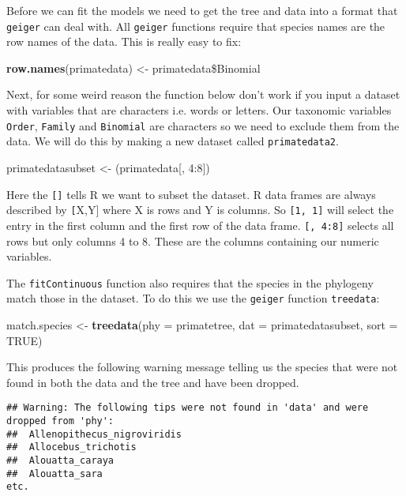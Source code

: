 \documentclass[11pt]{article}
\newcommand{\KeywordTok}[1]{\textcolor[rgb]{0.13,0.29,0.53}{\textbf{{#1}}}}
\newcommand{\DataTypeTok}[1]{\textcolor[rgb]{0.13,0.29,0.53}{{#1}}}
\newcommand{\DecValTok}[1]{\textcolor[rgb]{0.00,0.00,0.81}{{#1}}}
\newcommand{\StringTok}[1]{\textcolor[rgb]{0.31,0.60,0.02}{{#1}}}
\newcommand{\OtherTok}[1]{\textcolor[rgb]{0.56,0.35,0.01}{{#1}}}
\newcommand{\NormalTok}[1]{{#1}}
\begin{document}
Before we can fit the models we need to get the tree and data into a format that \texttt{geiger} can deal with. All \texttt{geiger} functions require that species names are the row names of the data. This is really easy to fix:

\begin{snugshade}
\begin{Highlighting}[]
\KeywordTok{row.names}\NormalTok{(primatedata) <-}\StringTok{ }\NormalTok{primatedata\$Binomial}
\end{Highlighting}
\end{snugshade}

Next, for some weird reason the function below don't work if you input a dataset with variables that are characters i.e. words or letters. Our taxonomic variables \texttt{Order}, \texttt{Family} and \texttt{Binomial} are characters so we need to exclude them from the data. We will do this by making a new dataset called \texttt{primatedata2}.

\begin{snugshade}
\begin{Highlighting}[]
\NormalTok{primatedatasubset <-}\StringTok{ }\NormalTok{(primatedata[,} \DecValTok{4:8}\NormalTok{])}
\end{Highlighting}
\end{snugshade}

Here the \texttt{[]} tells R we want to subset the dataset. R data frames are always described by \texttt[X,Y] where X is rows and Y is columns. So \texttt{[1, 1]} will select the entry in the first column and the first row of the data frame. \texttt{[, 4:8]} selects all rows but only columns 4 to 8. These are the columns containing our numeric variables.

The \texttt{fitContinuous} function also requires that the species in the phylogeny match those in the dataset. To do this we use the \texttt{geiger} function \texttt{treedata}:

\begin{snugshade}
\begin{Highlighting}[]
\NormalTok{match.species <-}\StringTok{ }\KeywordTok{treedata}\NormalTok{(}\DataTypeTok{phy = }\NormalTok{primatetree,} \DataTypeTok{dat = }\NormalTok{primatedatasubset,} \DataTypeTok{sort = }\OtherTok{TRUE}\NormalTok{)}
\end{Highlighting}
\end{snugshade}

This produces the following warning message telling us the species that were not found in both the data and the tree and have been dropped.
\begin{verbatim}
## Warning: The following tips were not found in 'data' and were dropped from 'phy':
##  Allenopithecus_nigroviridis
##  Allocebus_trichotis
##  Alouatta_caraya
##  Alouatta_sara
etc.
\end{verbatim}
\end{document}
